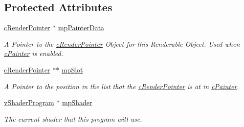 \subsection*{Protected Attributes}
\begin{DoxyCompactItemize}
\item 
\hyperlink{classc_render_pointer}{cRenderPointer} $\ast$ \hyperlink{classc_render_object_a4ed136f044fd1a7855c3500cd16ba74e}{mpPainterData}
\begin{DoxyCompactList}\small\item\em A Pointer to the \hyperlink{classc_render_pointer}{cRenderPointer} Object for this Renderable Object. Used when \hyperlink{classc_painter}{cPainter} is enabled. \item\end{DoxyCompactList}\item 
\hyperlink{classc_render_pointer}{cRenderPointer} $\ast$$\ast$ \hyperlink{classc_render_object_a9a96382f073ecbe57b4c43c639161f6c}{mpSlot}
\begin{DoxyCompactList}\small\item\em A Pointer to the position in the list that the \hyperlink{classc_render_pointer}{cRenderPointer} is at in \hyperlink{classc_painter}{cPainter}. \item\end{DoxyCompactList}\item 
\hyperlink{classv_shader_program}{vShaderProgram} $\ast$ \hyperlink{classc_render_object_a0c6a3cdf86f33d1463418f49be316f1d}{mpShader}
\begin{DoxyCompactList}\small\item\em The current shader that this program will use. \item\end{DoxyCompactList}\end{DoxyCompactItemize}


